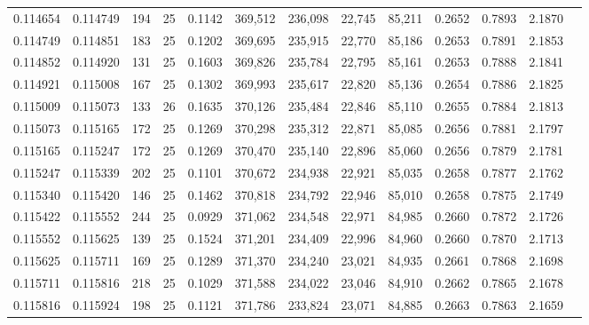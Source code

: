\begin{tabular}{rrrrrrrrrrrrr}
0.114654 & 0.114749 &   194 &  25 &                                     0.1142 & 369,512 & 236,098 &  22,745 &  85,211 & 0.2652 & 0.7893 & 2.1870 \\
0.114749 & 0.114851 &   183 &  25 &                                     0.1202 & 369,695 & 235,915 &  22,770 &  85,186 & 0.2653 & 0.7891 & 2.1853 \\
0.114852 & 0.114920 &   131 &  25 &                                     0.1603 & 369,826 & 235,784 &  22,795 &  85,161 & 0.2653 & 0.7888 & 2.1841 \\
0.114921 & 0.115008 &   167 &  25 &                                     0.1302 & 369,993 & 235,617 &  22,820 &  85,136 & 0.2654 & 0.7886 & 2.1825 \\
0.115009 & 0.115073 &   133 &  26 &                                     0.1635 & 370,126 & 235,484 &  22,846 &  85,110 & 0.2655 & 0.7884 & 2.1813 \\
0.115073 & 0.115165 &   172 &  25 &                                     0.1269 & 370,298 & 235,312 &  22,871 &  85,085 & 0.2656 & 0.7881 & 2.1797 \\
0.115165 & 0.115247 &   172 &  25 &                                     0.1269 & 370,470 & 235,140 &  22,896 &  85,060 & 0.2656 & 0.7879 & 2.1781 \\
0.115247 & 0.115339 &   202 &  25 &                                     0.1101 & 370,672 & 234,938 &  22,921 &  85,035 & 0.2658 & 0.7877 & 2.1762 \\
0.115340 & 0.115420 &   146 &  25 &                                     0.1462 & 370,818 & 234,792 &  22,946 &  85,010 & 0.2658 & 0.7875 & 2.1749 \\
0.115422 & 0.115552 &   244 &  25 &                                     0.0929 & 371,062 & 234,548 &  22,971 &  84,985 & 0.2660 & 0.7872 & 2.1726 \\
0.115552 & 0.115625 &   139 &  25 &                                     0.1524 & 371,201 & 234,409 &  22,996 &  84,960 & 0.2660 & 0.7870 & 2.1713 \\
0.115625 & 0.115711 &   169 &  25 &                                     0.1289 & 371,370 & 234,240 &  23,021 &  84,935 & 0.2661 & 0.7868 & 2.1698 \\
0.115711 & 0.115816 &   218 &  25 &                                     0.1029 & 371,588 & 234,022 &  23,046 &  84,910 & 0.2662 & 0.7865 & 2.1678 \\
0.115816 & 0.115924 &   198 &  25 &                                     0.1121 & 371,786 & 233,824 &  23,071 &  84,885 & 0.2663 & 0.7863 & 2.1659 \\

\end{tabular}
